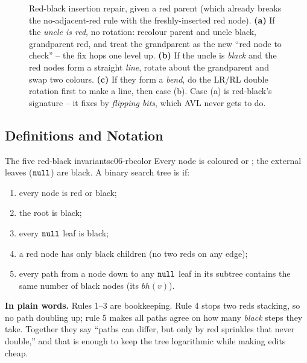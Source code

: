 \begin{figure}[H]
\begin{tikzpicture}[diagram, scale=0.82, transform shape]
\end{tikzpicture}
\caption{Red-black insertion repair, given a red parent (which already breaks the no-adjacent-red rule with
the freshly-inserted red node). \textbf{(a)} If the \emph{uncle is red}, no rotation: recolour parent and
uncle black, grandparent red, and treat the grandparent as the new ``red node to check'' -- the fix hops
one level up. \textbf{(b)} If the uncle is \emph{black} and the red nodes form a straight \emph{line}, rotate
about the grandparent and swap two colours. \textbf{(c)} If they form a \emph{bend}, do the LR/RL double
rotation first to make a line, then case (b). Case (a) is red-black's signature -- it fixes by
\emph{flipping bits}, which AVL never gets to do.}\label{fig:c06-rbfix}
\end{figure}

\subsection{Definitions and Notation}

\begin{definition}{The five red-black invariants}{c06-rbcolor}
Every node is coloured  or ; the external leaves ($\texttt{null}$) are black. A binary search
tree is  if:
\begin{enumerate}[nosep, leftmargin=1.6em]
  \item every node is red or black;
  \item the root is black;
  \item every $\texttt{null}$ leaf is black;
  \item a red node has only black children (no two reds on any edge);
  \item every path from a node down to any $\texttt{null}$ leaf in its subtree contains the same number of black
        nodes (its  $\mathit{bh}(v)$).
\end{enumerate}
\end{definition}

\noindent\textbf{In plain words.} Rules 1--3 are bookkeeping. Rule 4 stops two reds stacking, so no path
doubling up; rule 5 makes all paths agree on how many \emph{black} steps they take. Together they say
``paths can differ, but only by red sprinkles that never double,'' and that is enough to keep the tree
logarithmic while making edits cheap.

